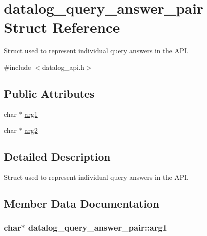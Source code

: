\hypertarget{structdatalog__query__answer__pair}{}\section{datalog\+\_\+query\+\_\+answer\+\_\+pair Struct Reference}
\label{structdatalog__query__answer__pair}


Struct used to represent individual query answers in the A\+PI.  




{\ttfamily \#include $<$datalog\+\_\+api.\+h$>$}

\subsection*{Public Attributes}
\begin{DoxyCompactItemize}
\item 
char $\ast$ \hyperlink{structdatalog__query__answer__pair_a67d3e57710c1e35b53c6835658be78ef}{arg1}
\item 
char $\ast$ \hyperlink{structdatalog__query__answer__pair_a10bde40ebdb18cef34e13cb413a92de1}{arg2}
\end{DoxyCompactItemize}


\subsection{Detailed Description}
Struct used to represent individual query answers in the A\+PI. 

\subsection{Member Data Documentation}
\subsubsection[{\texorpdfstring{arg1}{arg1}}]{\setlength{\rightskip}{0pt plus 5cm}char$\ast$ datalog\+\_\+query\+\_\+answer\+\_\+pair\+::arg1}\hypertarget{structdatalog__query__answer__pair_a67d3e57710c1e35b53c6835658be78ef}{}\label{structdatalog__query__answer__pair_a67d3e57710c1e35b53c6835658be78ef}
